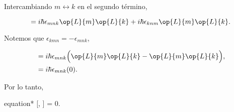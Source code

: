 \documentclass[../main.tex]{subfiles}
\begin{document}
\begin{problema}[10]
	Intercambiando \(m \leftrightarrow k\) en el segundo término,

	\begin{equation*}
		[\op{L}{}{2}, \op{L}{n}] = i\hbar\epsilon_{mnk}\op{L}{m}\op{L}{k} +
		i\hbar\epsilon_{knm}\op{L}{m}\op{L}{k}.
	\end{equation*}

	Notemos que \(\epsilon_{kmn} = -\epsilon_{mnk}\),

	\begin{align*}
		[\op{L}{}{2}, \op{L}{n}] & = i\hbar\epsilon_{mnk}\Bigl(\op{L}{m}\op{L}{k} - \op{L}{m}\op{L}{k}\Bigr), \\
		                         & = i\hbar\epsilon_{mnk}(0).
	\end{align*}

	Por lo tanto,

	\begin{empheq}[box = \mainresult]{equation*}
		[, ] = 0.
	\end{empheq}
\end{problema}
\end{document}
